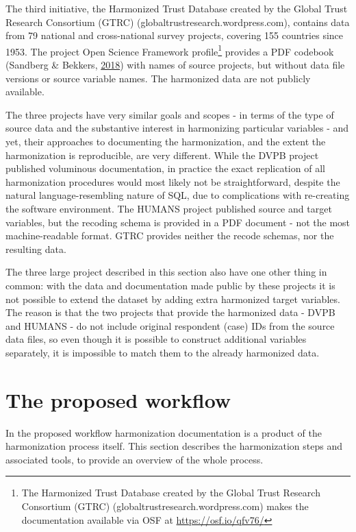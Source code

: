 \documentclass[12pt,]{article}
\let\rmarkdownfootnote\footnote%
\def\footnote{\protect\rmarkdownfootnote}
\begin{document}
The third initiative, the Harmonized Trust Database created by the Global Trust Research Consortium (GTRC) (globaltrustresearch.wordpress.com), contains data from 79 national and cross-national survey projects, covering 155 countries since 1953. The project Open Science Framework profile\footnote{The Harmonized Trust Database created by the Global Trust Research Consortium (GTRC) (globaltrustresearch.wordpress.com) makes the documentation available via OSF at \url{https://osf.io/qfv76/}} provides a PDF codebook (Sandberg \& Bekkers, \protect\hyperlink{ref-Sandberg2018}{2018}) with names of source projects, but without data file versions or source variable names. The harmonized data are not publicly available.

The three projects have very similar goals and scopes - in terms of the type of source data and the substantive interest in harmonizing particular variables - and yet, their approaches to documenting the harmonization, and the extent the harmonization is reproducible, are very different. While the DVPB project published voluminous documentation, in practice the exact replication of all harmonization procedures would most likely not be straightforward, despite the natural language-resembling nature of SQL, due to complications with re-creating the software environment. The HUMANS project published source and target variables, but the recoding schema is provided in a PDF document - not the most machine-readable format. GTRC provides neither the recode schemas, nor the resulting data.

The three large project described in this section also have one other thing in common: with the data and documentation made public by these projects it is not possible to extend the dataset by adding extra harmonized target variables. The reason is that the two projects that provide the harmonized data - DVPB and HUMANS - do not include original respondent (case) IDs from the source data files, so even though it is possible to construct additional variables separately, it is impossible to match them to the already harmonized data.

\hypertarget{the-proposed-workflow}{%
\section{The proposed workflow}\label{the-proposed-workflow}}

In the proposed workflow harmonization documentation is a product of the harmonization process itself. This section describes the harmonization steps and associated tools, to provide an overview of the whole process.
\end{document}
